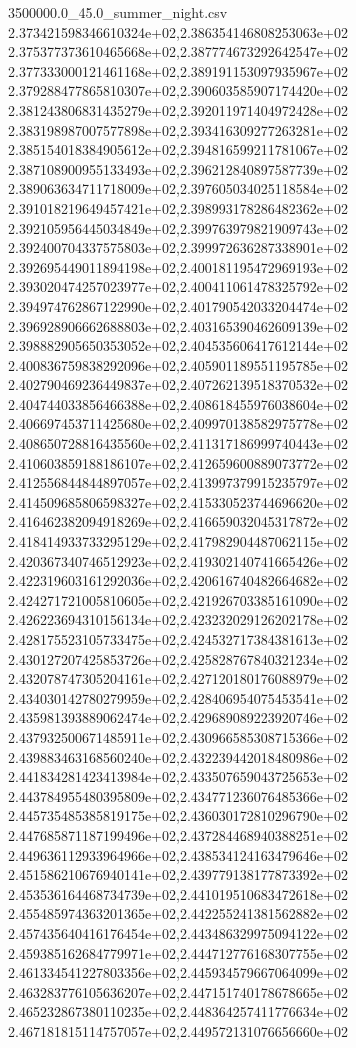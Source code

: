 \begin{filecontents*}{3500000.0_45.0_summer_night.csv}
2.373421598346610324e+02,2.386354146808253063e+02
2.375377373610465668e+02,2.387774673292642547e+02
2.377333000121461168e+02,2.389191153097935967e+02
2.379288477865810307e+02,2.390603585907174420e+02
2.381243806831435279e+02,2.392011971404972428e+02
2.383198987007577898e+02,2.393416309277263281e+02
2.385154018384905612e+02,2.394816599211781067e+02
2.387108900955133493e+02,2.396212840897587739e+02
2.389063634711718009e+02,2.397605034025118584e+02
2.391018219649457421e+02,2.398993178286482362e+02
2.392105956445034849e+02,2.399763979821909743e+02
2.392400704337575803e+02,2.399972636287338901e+02
2.392695449011894198e+02,2.400181195472969193e+02
2.393020474257023977e+02,2.400411061478325792e+02
2.394974762867122990e+02,2.401790542033204474e+02
2.396928906662688803e+02,2.403165390462609139e+02
2.398882905650353052e+02,2.404535606417612144e+02
2.400836759838292096e+02,2.405901189551195785e+02
2.402790469236449837e+02,2.407262139518370532e+02
2.404744033856466388e+02,2.408618455976038604e+02
2.406697453711425680e+02,2.409970138582975778e+02
2.408650728816435560e+02,2.411317186999740443e+02
2.410603859188186107e+02,2.412659600889073772e+02
2.412556844844897057e+02,2.413997379915235797e+02
2.414509685806598327e+02,2.415330523744696620e+02
2.416462382094918269e+02,2.416659032045317872e+02
2.418414933733295129e+02,2.417982904487062115e+02
2.420367340746512923e+02,2.419302140741665426e+02
2.422319603161292036e+02,2.420616740482664682e+02
2.424271721005810605e+02,2.421926703385161090e+02
2.426223694310156134e+02,2.423232029126202178e+02
2.428175523105733475e+02,2.424532717384381613e+02
2.430127207425853726e+02,2.425828767840321234e+02
2.432078747305204161e+02,2.427120180176088979e+02
2.434030142780279959e+02,2.428406954075453541e+02
2.435981393889062474e+02,2.429689089223920746e+02
2.437932500671485911e+02,2.430966585308715366e+02
2.439883463168560240e+02,2.432239442018480986e+02
2.441834281423413984e+02,2.433507659043725653e+02
2.443784955480395809e+02,2.434771236076485366e+02
2.445735485385819175e+02,2.436030172810296790e+02
2.447685871187199496e+02,2.437284468940388251e+02
2.449636112933964966e+02,2.438534124163479646e+02
2.451586210676940141e+02,2.439779138177873392e+02
2.453536164468734739e+02,2.441019510683472618e+02
2.455485974363201365e+02,2.442255241381562882e+02
2.457435640416176454e+02,2.443486329975094122e+02
2.459385162684779971e+02,2.444712776168307755e+02
2.461334541227803356e+02,2.445934579667064099e+02
2.463283776105636207e+02,2.447151740178678665e+02
2.465232867380110235e+02,2.448364257411776634e+02
2.467181815114757057e+02,2.449572131076656660e+02

\end{filecontents*}
